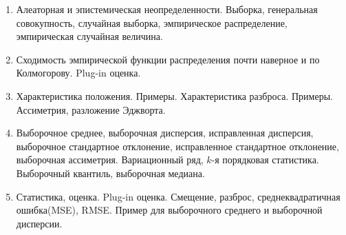 
\begin{enumerate}
	\item Алеаторная и эпистемическая неопределенности. Выборка, генеральная совокупность, случайная выборка, эмпирическое распределение, эмпирическая случайная величина.
	\item Сходимость эмпирической функции распределения почти наверное и по Колмогорову. Plug-in оценка.
	\item Характеристика положения. Примеры. Характеристика разброса. Примеры. Ассиметрия, разложение Эджворта.
	\item Выборочное среднее, выборочная дисперсия, исправленная дисперсия, выборочное стандартное отклонение, исправленное стандартное отклонение, выборочная ассиметрия. Вариационный ряд, $k$-я порядковая статистика. Выборочный квантиль, выборочная медиана.
	\item Статистика, оценка. Plug-in оценка. Смещение, разброс, среднеквадратичная ошибка(MSE), RMSE. Пример для выборочного среднего и выборочной дисперсии.
	
\end{enumerate}
